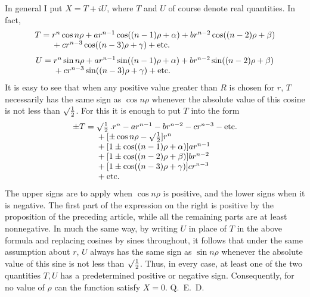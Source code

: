 In general I put $X=T+iU$, where $T$ and $U$ of course denote real quantities. In fact,
\[
\begin{array}{r@{}l}
T={}&r^n\cos n\rho+ar^{n-1}\cos((n-1)\rho+\alpha)+br^{n-2}\cos((n-2)\rho+\beta)\\
&{}+cr^{n-3}\cos((n-3)\rho+\gamma)+\mbox{etc.}
\end{array}
\]
\[
\begin{array}{r@{}l}
U={}&r^n\sin n\rho+ar^{n-1}\sin((n-1)\rho+\alpha)+br^{n-2}\sin((n-2)\rho+\beta)\\
&{}+cr^{n-3}\sin((n-3)\rho+\gamma)+\mbox{etc.}
\end{array}
\]
It is easy to see that when any positive value greater than $R$ is chosen for $r$, $T$ necessarily has the same sign as $\cos n\rho$ whenever the absolute value of this cosine is not less than $\surd\frac12$. For this it is enough to put $T$ into the form
\[
\begin{array}{r@{}l}
\pm T={}&\surd\frac12\,.r^n-ar^{n-1}-br^{n-2}-cr^{n-3}-\mbox{etc.}\\
&{}+[\pm\cos n\rho-\surd\frac12]r^n\\
&{}+[1\pm\cos((n-1)\rho+\alpha)]ar^{n-1}\\
&{}+[1\pm\cos((n-2)\rho+\beta)]br^{n-2}\\
&{}+[1\pm\cos((n-3)\rho+\gamma)]cr^{n-3}\\
&{}+\mbox{etc.}
\end{array}
\]
The upper signs are to apply when $\cos n\rho$ is positive, and the lower signs when it is negative. The first part of the expression on the right is positive by the proposition of the preceding article, while all the remaining parts are at least nonnegative. In much the same way, by writing $U$ in place of $T$ in the above formula and replacing cosines by sines throughout, it follows that under the same assumption about $r$, $U$ always has the same sign as $\sin n\rho$ whenever the absolute value of this sine is not less than $\surd\frac12$. Thus, in every case, at least one of the two quantities $T,U$ has a predetermined positive or negative sign. Consequently, for no value of $\rho$ can the function satisfy $X=0$. Q.~E.~D.

